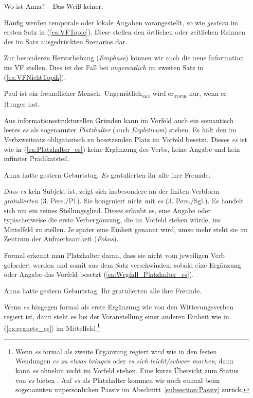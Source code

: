 \ea \label{ea:Topikdrop} Wo ist Anna? -- \sout{Das} Weiß keiner.
\z 

Häufig werden temporale oder lokale Angaben vorangestellt, so wie \textit{gestern} im ersten Satz in (\ref{ea:VFTopic}). Diese stellen den örtlichen oder zeitlichen Rahmen des im Satz ausgedrückten Szenarios dar.

Zur besonderen Hervorhebung (\textit{Emphase}) können wir auch die neue Information ins VF stellen. Dies ist der  Fall bei \textit{ungemütlich} im zweiten Satz in (\ref{ea:VFNichtTopik}). 

\ea \label{ea:VFNichtTopik} Paul ist ein freundlicher Mensch. Ungemütlich\textsubscript{\textsc{neu}} wird er\textsubscript{\textsc{topik}} nur, wenn er Hunger hat.
\z 

Aus informationsstrukturellen Gründen kann im Vorfeld auch ein semantisch leeres \textit{es} als sogenannter \textit{Platzhalter} (auch \textit{Expletivum}) stehen. Es hält den im Verbzweitsatz obligatorisch zu besetzenden Platz im Vorfeld besetzt. Dieses \textit{es} ist wie in (\ref{ea:Platzhalter_es}) keine Ergänzung des Verbs, keine Angabe und kein infiniter Prädikatsteil.   

\ea \label{ea:Platzhalter_es} Anna hatte gestern Geburtstag. \textit{Es} gratulierten ihr alle ihre Freunde.
\z 

Dass \textit{es} kein Subjekt ist, zeigt sich insbesondere an der finiten Verbform \textit{gratulierten} (3. Pers./Pl.). Sie kongruiert nicht mit \textit{es} (3. Pers./Sgl.). Es handelt sich um ein reines Stellungsglied. Dieses erlaubt es, eine Angabe oder typischerweise die erste Verbergänzung, die im Vorfeld stehen würde, ins Mittelfeld zu stellen. Je später eine Einheit genannt wird, umso mehr steht sie im Zentrum der Aufmerksamkeit (\textit{Fokus}). 

Formal erkennt man Platzhalter daran, dass sie nicht vom jeweiligen Verb gefordert werden und somit aus dem Satz verschwinden, sobald eine Ergänzung oder Angabe das Vorfeld besetzt (\ref{ea:Wegfall_Platzhalter_es}). 

\ea \label{ea:Wegfall_Platzhalter_es} Anna hatte gestern Geburtstag. Ihr gratulierten alle ihre Freunde.
\z 

Wenn \textit{es} hingegen formal als erste Ergänzung wie von den Witterungsverben regiert ist, dann steht es bei der Voranstellung einer anderen Einheit wie in (\ref{ex:regnete_es}) im Mittelfeld.\footnote{Wenn \textit{es} formal als zweite Ergänzung regiert wird wie in den festen Wendungen \textit{es zu etwas bringen} oder \textit{es sich leicht/schwer machen}, dann kann \textit{es} ohnehin nicht im Vorfeld stehen. Eine kurze Übersicht zum Status von \textit{es} bieten \citet[239--244]{HelbigBuscha}. Auf \textit{es} als Platzhalter kommen wir noch einmal beim sogenannten unpersönlichen Passiv im Abschnitt~\ref{subsection:Passiv} zurück.}

